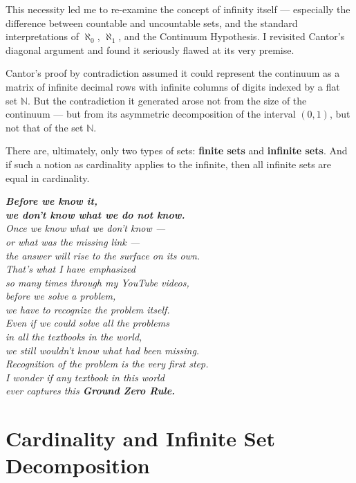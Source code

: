 \documentclass[12pt]{article}
\theoremstyle{definition} %
\numberwithin{equation}{section}
\begin{document}
\vspace{1em}
This necessity led me to re-examine the concept of infinity itself — especially the difference between countable and uncountable sets, and the standard interpretations of \( \aleph_0 \), \( \aleph_1 \), and the Continuum Hypothesis. I revisited Cantor’s diagonal argument and found it seriously flawed at its very premise.

\vspace{1em}
Cantor’s proof by contradiction assumed it could represent the continuum as a matrix of infinite decimal rows with infinite columns of digits indexed by a flat set \( \mathbb{N} \). But the contradiction it generated arose not from the size of the continuum — but from its asymmetric decomposition of the interval \((0, 1)\), but not that of the set \( \mathbb{N} \).

\vspace{1em}
There are, ultimately, only two types of sets: \textbf{finite sets} and \textbf{infinite sets}. And if such a notion as cardinality applies to the infinite, then all infinite sets are equal in cardinality.

\vspace{3em}
\begin{center}
\textit{
\textbf{Before we know it,\\
we don't know what we do not know.}\\[2ex]
Once we know what we don't know —\\
or what was the missing link — \\
the answer will rise to the surface on its own.\\[1ex] 
That's what I have emphasized\\
so many times through my YouTube videos, \\
before we solve a problem,\\
we have to recognize the problem itself. \\[1ex]
Even if we could solve all the problems\\
in all the textbooks in the world, \\[1ex]
we still wouldn't know what had been missing. \\[1ex]
Recognition of the problem is the very first step. \\[1ex]
I wonder if any textbook in this world\\
ever captures this \textbf{Ground Zero Rule.}
}
\end{center}

\newpage
\section{Cardinality and Infinite Set Decomposition}
\end{document}
